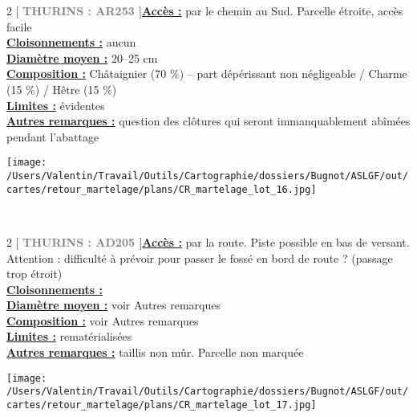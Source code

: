 \documentclass[a4paper,openany]{book}\usepackage[]{graphicx}\usepackage[]{color}
\begin{document}
\begin{multicols}{2}
[
\textbf{\textcolor{gray}{
\large THURINS : AR253
}}
]\noindent\textbf{\underline{Accès :}} par le chemin au Sud. Parcelle étroite, accès facile\vspace{0.1cm} \\\noindent\textbf{\underline{Cloisonnements :}} aucun\vspace{0.1cm} \\\noindent\textbf{\underline{Diamètre moyen :}} 20--25 cm\vspace{0.1cm} \\\noindent\textbf{\underline{Composition :}} Châtaignier (70 \%) -- part dépérissant non négligeable / Charme (15 \%) / Hêtre (15 \%)\vspace{0.1cm} \\\noindent\textbf{\underline{Limites :}} évidentes\vspace{0.1cm} \\\noindent\textbf{\underline{Autres remarques :}} question des clôtures qui seront immanquablement abîmées pendant l'abattage\vspace{0.1cm} \\\end{multicols}\begin{center}
\texttt{[image: /Users/Valentin/Travail/Outils/Cartographie/dossiers/Bugnot/ASLGF/out/cartes/retour\_martelage/plans/CR\_martelage\_lot\_16.jpg]}
\end{center}\newpage\noindent
{}\\\begin{multicols}{2}
[
\textbf{\textcolor{gray}{
\large THURINS : AD205
}}
]\noindent\textbf{\underline{Accès :}} par la route. Piste possible en bas de versant. Attention : difficulté à prévoir pour passer le fossé en bord de route ? (passage trop étroit)\vspace{0.1cm} \\\noindent\textbf{\underline{Cloisonnements :}} \vspace{0.1cm} \\\noindent\textbf{\underline{Diamètre moyen :}} voir Autres remarques\vspace{0.1cm} \\\noindent\textbf{\underline{Composition :}} voir Autres remarques\vspace{0.1cm} \\\noindent\textbf{\underline{Limites :}} rematérialisées\vspace{0.1cm} \\\noindent\textbf{\underline{Autres remarques :}} taillis non mûr. Parcelle non marquée\vspace{0.1cm} \\\end{multicols}\begin{center}
\texttt{[image: /Users/Valentin/Travail/Outils/Cartographie/dossiers/Bugnot/ASLGF/out/cartes/retour\_martelage/plans/CR\_martelage\_lot\_17.jpg]}
\end{center}\newpage\noindent
\end{document}

